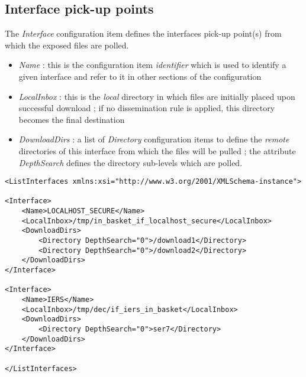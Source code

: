 \documentclass[dec_sum_main.tex]{subfiles}
\begin{document}
\subsection{Interface pick-up points}
The \textit{Interface} configuration item defines the interfaces pick-up point(s) from which the exposed files are polled.
\par
\noindent
\label{LocalInbox}
\label{DownloadDirs}
\begin{itemize}
	\item \textit{Name} : this is the configuration item \textit{identifier} which is used to identify a given interface and refer to it in other sections of the configuration
	\item \textit{LocalInbox} : this is the \textit{local} directory in which files are initially placed upon successful download ; if no dissemination rule is applied, this directory becomes the final destination  
	\item \textit{DownloadDirs} : a list of \textit{Directory} configuration items to define the \textit{remote} directories of this interface from which the files will be pulled ; the attribute \textit{DepthSearch} defines the directory sub-levels which are polled.
\end{itemize}


\begin{lstlisting}
<ListInterfaces xmlns:xsi="http://www.w3.org/2001/XMLSchema-instance">

<Interface>
	<Name>LOCALHOST_SECURE</Name>
	<LocalInbox>/tmp/in_basket_if_localhost_secure</LocalInbox>
	<DownloadDirs>
		<Directory DepthSearch="0">/download1</Directory>
		<Directory DepthSearch="0">/download2</Directory>
	</DownloadDirs>
</Interface>
				
<Interface>
	<Name>IERS</Name>
	<LocalInbox>/tmp/dec/if_iers_in_basket</LocalInbox>
	<DownloadDirs>
		<Directory DepthSearch="0">ser7</Directory>
	</DownloadDirs>
</Interface>
		
</ListInterfaces>
\end{lstlisting}

\par
\noindent
	
\end{document}
